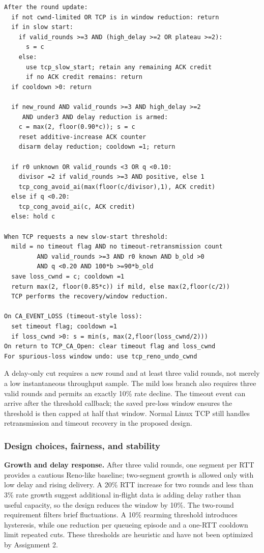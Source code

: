 \documentclass[11pt,letterpaper]{article}
\begin{document}
{\footnotesize\begin{verbatim}
After the round update:
  if not cwnd-limited OR TCP is in window reduction: return
  if in slow start:
    if valid_rounds >=3 AND (high_delay >=2 OR plateau >=2):
      s = c
    else:
      use tcp_slow_start; retain any remaining ACK credit
      if no ACK credit remains: return
  if cooldown >0: return

  if new_round AND valid_rounds >=3 AND high_delay >=2
     AND under3 AND delay reduction is armed:
    c = max(2, floor(0.90*c)); s = c
    reset additive-increase ACK counter
    disarm delay reduction; cooldown =1; return

  if r0 unknown OR valid_rounds <3 OR q <0.10:
    divisor =2 if valid_rounds >=3 AND positive, else 1
    tcp_cong_avoid_ai(max(floor(c/divisor),1), ACK credit)
  else if q <0.20:
    tcp_cong_avoid_ai(c, ACK credit)
  else: hold c

When TCP requests a new slow-start threshold:
  mild = no timeout flag AND no timeout-retransmission count
         AND valid_rounds >=3 AND r0 known AND b_old >0
         AND q <0.20 AND 100*b >=90*b_old
  save loss_cwnd = c; cooldown =1
  return max(2, floor(0.85*c)) if mild, else max(2,floor(c/2))
  TCP performs the recovery/window reduction.

On CA_EVENT_LOSS (timeout-style loss):
  set timeout flag; cooldown =1
  if loss_cwnd >0: s = min(s, max(2,floor(loss_cwnd/2)))
On return to TCP_CA_Open: clear timeout flag and loss_cwnd
For spurious-loss window undo: use tcp_reno_undo_cwnd
\end{verbatim}}

A delay-only cut requires a new round and at least three valid rounds, not merely
a low instantaneous throughput sample. The mild loss branch also requires
three valid rounds and permits an exactly 10\% rate decline. The timeout event
can arrive after the threshold callback; the saved pre-loss window ensures the
threshold is then capped at half that window. Normal Linux TCP still handles
retransmission and timeout recovery in the proposed design.

\clearpage
\subsubsection{Design choices, fairness, and stability}
\textbf{Growth and delay response.} After three valid rounds, one segment per RTT provides a cautious
Reno-like baseline; two-segment growth is allowed only with low delay and rising
delivery. A 20\% RTT increase for two rounds and less than 3\% rate growth
suggest additional in-flight data is adding delay rather than useful capacity,
so the design reduces the window by 10\%. The two-round requirement filters
brief fluctuations. A 10\% rearming threshold introduces hysteresis, while one
reduction per queueing episode and a one-RTT cooldown limit repeated cuts.
These thresholds are heuristic and have not been optimized by Assignment 2.
\end{document}
